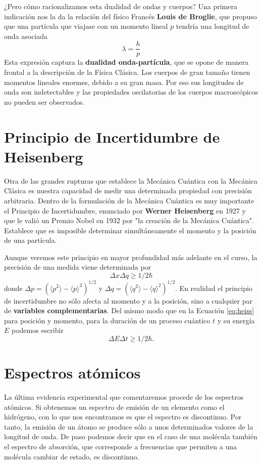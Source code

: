 \documentclass{tufte-handout}
\begin{document}
¿Pero cómo racionalizamos esta dualidad de ondas y cuerpos?
Una primera indicación nos la da la relación del físico Francés
\textbf{Louis de Broglie}, que propuso que una partícula que viajase
con un momento lineal $p$ tendría una longitud de onda asociada
\begin{equation}
\lambda=\frac{h}{p}\label{eq:debroglie}
\end{equation}
Esta expresión captura la \textbf{dualidad onda-partícula},
que se opone de manera frontal a la descripción de la Física 
Clásica.
Los cuerpos de gran tamaño tienen momentos lineales enormes, debido
a su gran masa. Por eso sus longitudes de onda son indetectables
y las propiedades oscilatorias de los cuerpos macroscópicos no 
pueden ser observados.	

\section{Principio de Incertidumbre de Heisenberg}
Otra de las grandes rupturas que establece la Mecánica Cuántica 
con la Mecánica Clásica es nuestra capacidad de medir una 
determinada propiedad con precisión arbitraria. Dentro de la 
formulación de la Mecánica Cuántica es muy importante el Principio
de Incertidumbre, enunciado por \textbf{Werner Heisenberg} en 1927
y que le valió un Premio Nobel en 1932 por "la creación de la Mecánica
Cuántica". 
Establece que es imposible determinar simultáneamente el momento 
y la posición de una partícula. 

Aunque veremos este principio en 
mayor profundidad más adelante en el curso, la precisión de una
medida viene determinada por
\begin{equation}
    \Delta x\Delta q\geq 1/2\hbar\label{eq:heiss}
\end{equation}
donde $\Delta p=(\langle p^2\rangle-\langle p \rangle^2)^{1/2}$ y
$\Delta q=(\langle q^2\rangle-\langle q\rangle^2)^{1/2}$. En realidad
el principio de incertidumbre no sólo afecta al momento y a la posición, sino a 
cualquier par de \textbf{variables complementarias}. Del mismo modo
que en la Ecuación \ref{eq:heiss} para posición y momento, para 
la duración de un proceso cuántico $t$ y su energía $E$ podemos
escribir
\begin{equation}
    \Delta E\Delta t\geq 1/2\hbar.
\end{equation}

\section{Espectros atómicos}
La última evidencia experimental que comentaremos procede de los 
espectros atómicos. Si  obtenemos un espectro de emisión
de un elemento como el hidrógeno, con lo que nos encontramos
es que el espectro es discontinuo. Por tanto, la emisión de un
átomo se produce sólo a unos determinados valores de la longitud
de onda. De paso podemos decir que en el caso de una molécula 
también el espectro de absorción, que corresponde a frecuencias
que permiten a una molécula cambiar de estado, es discontinuo.
\end{document}
